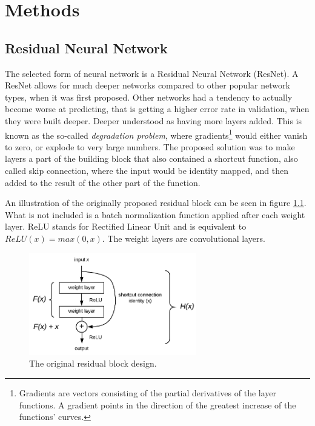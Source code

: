 \chapter{Methods}
\section{Residual Neural Network}
The selected form of neural network is a Residual Neural Network (ResNet). A ResNet allows for much deeper networks compared to other popular network types, when it was first proposed\cite{HeKaimingandZhangXiangyuandRenShaoqingandSun2016}. Other networks had a tendency to actually become worse at predicting, that is getting a higher error rate in validation, when they were built deeper. Deeper understood as having more layers added. This is known as the so-called \textit{degradation problem}, where gradients\footnote{Gradients are vectors consisting of the partial derivatives of the layer functions. A gradient points in the direction of the greatest increase of the functions' curves.} would either vanish to zero, or explode to very large numbers. The proposed solution was to make layers a part of the building block that also contained a shortcut function, also called skip connection, where the input would be identity mapped, and then added to the result of the other part of the function. 

An illustration of the originally proposed residual block can be seen in figure \ref{fig-res-block}. What is not included is a batch normalization function applied after each weight layer. ReLU stands for Rectified Linear Unit and is equivalent to $ReLU(x) = max(0,x)$. The weight layers are convolutional layers.

\begin{figure}[ht]
	\centering
	\includegraphics[width=0.65\textwidth]{figures/res-block-2}
	\caption{The original residual block design.}
	\label{fig-res-block}
\end{figure}

